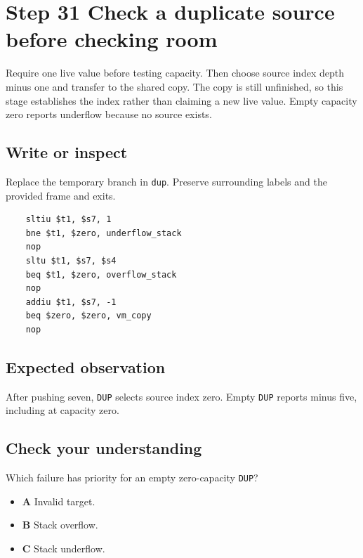 \section{Step 31 Check a duplicate source before checking room}\label{vm-s31}

Require one live value before testing capacity. Then choose source index depth minus one and transfer to the shared copy. The copy is still unfinished, so this stage establishes the index rather than claiming a new live value. Empty capacity zero reports underflow because no source exists.

\subsection{Write or inspect}
Replace the temporary branch in \texttt{dup}. Preserve surrounding labels and the provided frame and exits.

\begin{verbatim}
    sltiu $t1, $s7, 1
    bne $t1, $zero, underflow_stack
    nop
    sltu $t1, $s7, $s4
    beq $t1, $zero, overflow_stack
    nop
    addiu $t1, $s7, -1
    beq $zero, $zero, vm_copy
    nop
\end{verbatim}
\subsection{Expected observation}
After pushing seven, \texttt{DUP} selects source index zero. Empty \texttt{DUP} reports minus five, including at capacity zero.

\subsection{Check your understanding}
Which failure has priority for an empty zero-capacity \texttt{DUP}?

\begin{itemize}
  \item \textbf{A} Invalid target.
  \item \textbf{B} Stack overflow.
  \item \textbf{C} Stack underflow.
\end{itemize}
